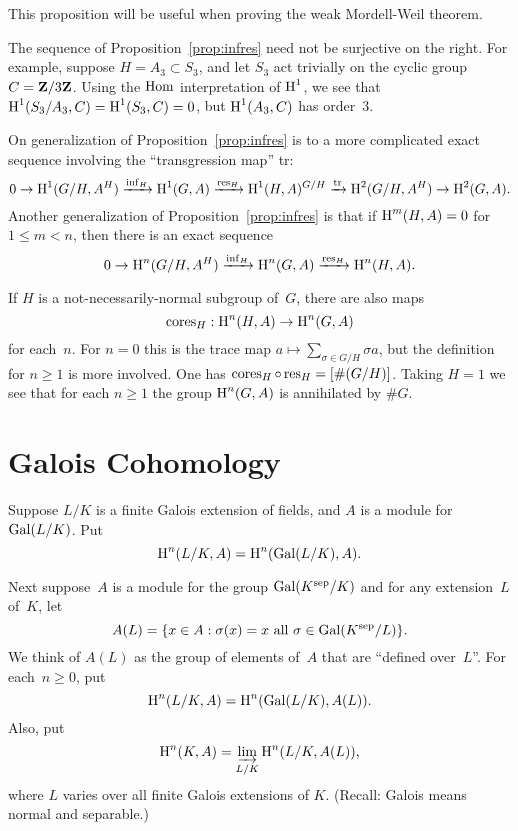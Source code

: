 This proposition will be useful when proving
the weak Mordell-Weil theorem.

\begin{example}
The sequence of Proposition~\ref{prop:infres} need not be
surjective on the right.  For example, suppose $H=A_3 \subset S_3$,
and let $S_3$ act trivially on the cyclic group $C = \mathbf{Z}/3\mathbf{Z}$.
Using the $\operatorname{Hom}$ interpretation of $\operatorname{H}^1$, we see
that 
$\operatorname{H}^1(S_3/A_3, C) = \operatorname{H}^1(S_3, C) = 0$, but 
$\operatorname{H}^1(A_3, C)$ has order~$3$.
\end{example}


\begin{remark}
On generalization of Proposition~\ref{prop:infres} is to
a more complicated exact sequence involving the ``transgression map'' 
tr:
$$
  0 \to \operatorname{H}^1(G/H, A^H)\xrightarrow{\operatorname{inf}_H} \operatorname{H}^1(G,A)\xrightarrow{\operatorname{res}_H} \operatorname{H}^1(H,A)^{G/H}
\xrightarrow{{\rm tr}}  \operatorname{H}^2(G/H,A^H) \to \operatorname{H}^2(G,A).
$$
Another generalization of Proposition~\ref{prop:infres}
is that if $\operatorname{H}^m(H,A) = 0$ for $1\leq m < n$, then
there is an exact sequence
$$ 
 0 \to \operatorname{H}^n(G/H, A^H)\xrightarrow{\operatorname{inf}_H}  \operatorname{H}^n(G,A)\xrightarrow{\operatorname{res}_H} \operatorname{H}^n(H,A).
$$
\end{remark}

\begin{remark}\label{rmk:cores}
  If $H$ is a not-necessarily-normal subgroup of~$G$, there are also
  maps
$$
 \operatorname{cores}_H: \operatorname{H}^n(H,A) \to \operatorname{H}^n(G,A)
$$
for each~$n$.  For $n=0$ this is the trace map $a\mapsto \sum_{\sigma
  \in G/H} \sigma a$, but the definition for $n\geq 1$ is more involved.
One has $\operatorname{cores}_H \circ \operatorname{res}_H = [\#(G/H)]$. 
Taking $H=1$ we see 
that for each $n\geq 1$ the group
$\operatorname{H}^n(G,A)$ is annihilated by $\#G$. 
\end{remark}

\section{Galois Cohomology}
Suppose $L/K$ is a finite Galois extension of 
fields, and $A$ is a module for $\operatorname{Gal}(L/K)$.
Put
$$
 \operatorname{H}^n(L/K, A) = \operatorname{H}^n(\operatorname{Gal}(L/K), A).
$$

Next suppose~$A$ is a module for the group $\operatorname{Gal}(K^{\operatorname{sep}}/K)$
and for any extension~$L$ of~$K$, let
$$A(L) = \{x \in A : \sigma(x) = x \text{ all } \sigma \in\operatorname{Gal}(K^{\operatorname{sep}}/L)\}.$$
We think of $A(L)$ as the group of elements of~$A$ that are
``defined over~$L$''.  
For each~$n\geq 0$, put
 $$ 
  \operatorname{H}^n(L/K, A) = \operatorname{H}^n(\operatorname{Gal}(L/K), A(L)).
$$
Also, put
$$
 \operatorname{H}^n(K,A) = \varinjlim_{L/K} \operatorname{H}^n(L/K,A(L)),
$$
where $L$ varies over all finite Galois extensions of $K$.
(Recall: Galois means normal and separable.)

